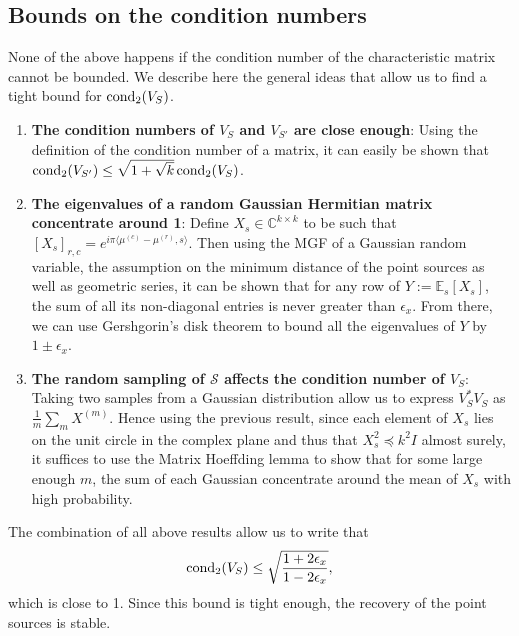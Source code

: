 \subsection{Bounds on the condition numbers}
None of the above happens if the condition number of the characteristic matrix cannot be bounded. We describe here the general ideas that allow us to find a tight bound for $\operatorname*{cond_2}(V_S)$.
\begin{enumerate}
    \item {\bf The condition numbers of $V_S$ and $V_{S'}$ are close enough}: Using the definition of the condition number of a matrix, it can easily be shown that $\operatorname*{cond_2}(V_{S'})\leq\sqrt{1+\sqrt{k}}\operatorname*{cond_2}(V_S)$.
    \item {\bf The eigenvalues of a random Gaussian Hermitian matrix concentrate around 1}: Define $X_s\in\mathbb{C}^{k\times k}$ to be such that $[X_s]_{r,c}=e^{i\pi\langle\mu^{(c)}-\mu^{(r)},s\rangle}$. Then using the MGF of a Gaussian random variable, the assumption on the minimum distance of the point sources as well as geometric series, it can be shown that for any row of $Y:=\mathbb{E}_s[X_s]$, the sum of all its non-diagonal entries is never greater than $\epsilon_x$. From there, we can use Gershgorin's disk theorem to bound all the eigenvalues of $Y$ by $1\pm\epsilon_x$.
    \item {\bf The random sampling of $\mathcal{S}$ affects the condition number of $V_S$}: Taking two samples from a Gaussian distribution allow us to express $V_S^*V_S$ as $\frac{1}{m}\sum_m X^{(m)}$. Hence using the previous result, since each element of $X_s$ lies on the unit circle in the complex plane and thus that $X_s^2\preceq k^2 I$ almost surely, it suffices to use the Matrix Hoeffding lemma to show that for some large enough $m$, the sum of each Gaussian concentrate around the mean of $X_s$ with high probability.
\end{enumerate}
The combination of all above results allow us to write that $$\operatorname*{cond_2}(V_S)\leq\sqrt{\frac{1+2\epsilon_x}{1-2\epsilon_x}},$$ which is close to 1. Since this bound is tight enough, the recovery of the point sources is stable.